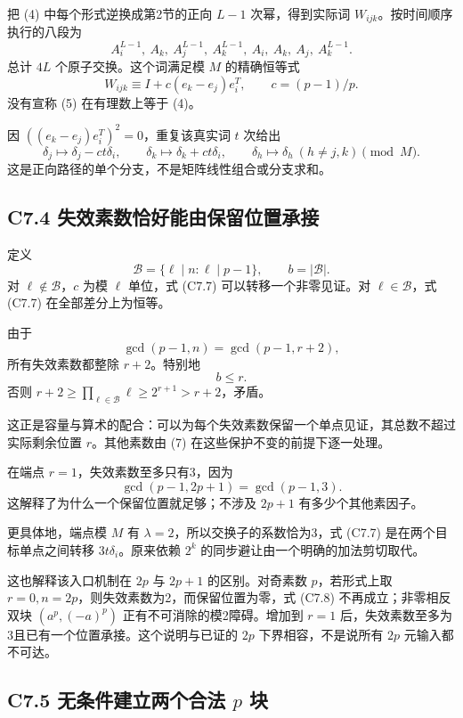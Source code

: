 \documentclass[11pt,a4paper]{article}
\theoremstyle{definition}
\numberwithin{equation}{section}
\begin{document}
{把} {(4)} {中每个形式逆换成第2节的正向} \(L-1\) {次幂，得到实际词} \(W_{ijk}\){。按时间顺序执行的八段为} \[
A_i^{L-1},\ A_k,\ A_j^{L-1},\ A_k^{L-1},
\ A_i,\ A_k,\ A_j,\ A_k^{L-1}.\tag{C7.5}
\] {总计} \(4L\) {个原子交换。这个词满足模} \(M\) {的精确恒等式} \[
W_{ijk}\equiv I+c(e_k-e_j)e_i^T,\qquad c=(p-1)/p.
\tag{C7.6}
\] {没有宣称} {(5)} {在有理数上等于} {(4)。}

{因} \(((e_k-e_j)e_i^T)^2=0\){，重复该真实词} \(t\) {次给出} \[
\delta_j\mapsto\delta_j-ct\delta_i,\qquad
\delta_k\mapsto\delta_k+ct\delta_i,\qquad
\delta_h\mapsto\delta_h\ (h\ne j,k)
\pmod M.\tag{C7.7}
\] {这是正向路径的单个分支，不是矩阵线性组合或分支求和。}

\subsection*{\texorpdfstring{{C7.4} {失效素数恰好能由保留位置承接}}{C7.4 失效素数恰好能由保留位置承接}}\label{C7-h42}

{定义} \[
\mathcal B=\{\ell\mid n:\ell\mid p-1\},\qquad b=|\mathcal B|.
\] {对} \(\ell\notin\mathcal B\){，}\(c\) {为模} \(\ell\) {单位，式} {(C7.7)} {可以转移一个非零见证。对} \(\ell\in\mathcal B\){，式} {(C7.7)} {在全部差分上为恒等。}

{由于} \[
\gcd(p-1,n)=\gcd(p-1,r+2),
\] {所有失效素数都整除} \(r+2\){。特别地} \[
\boxed{b\le r.}\tag{C7.8}
\] {否则} \(r+2\ge\prod_{\ell\in\mathcal B}\ell\ge2^{r+1}>r+2\){，矛盾。}

{这正是容量与算术的配合：可以为每个失效素数保留一个单点见证，其总数不超过实际剩余位置} \(r\){。其他素数由} {(7)} {在这些保护不变的前提下逐一处理。}

{在端点} \(r=1\){，失效素数至多只有3，因为} \[
\gcd(p-1,2p+1)=\gcd(p-1,3).
\] {这解释了为什么一个保留位置就足够；不涉及} \(2p+1\) {有多少个其他素因子。}

{更具体地，端点模} \(M\) {有} \(\lambda=2\){，所以交换子的系数恰为3，式} {(C7.7)} {是在两个目标单点之间转移} \(3t\delta_i\){。原来依赖} \(2^k\) {的同步避让由一个明确的加法剪切取代。}

{这也解释该入口机制在} \(2p\) {与} \(2p+1\) {的区别。对奇素数} \(p\){，若形式上取} \(r=0,n=2p\){，则失效素数为2，而保留位置为零，式} {(C7.8)} {不再成立；非零相反双块} \((a^p,(-a)^p)\) {正有不可消除的模2障碍。增加到} \(r=1\) {后，失效素数至多为3且已有一个位置承接。这个说明与已证的} \(2p\) {下界相容，不是说所有} \(2p\) {元输入都不可达。}

\subsection*{\texorpdfstring{{C7.5} {无条件建立两个合法} \(p\) {块}}{C7.5 无条件建立两个合法 p 块}}\label{C7-h43}
\end{document}
